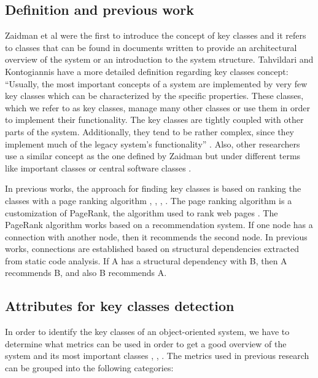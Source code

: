 \documentclass[12pt]{mitthesis}
\begin{document}
\subsection{Definition and previous work}
\label{sec:definition}
Zaidman et al \cite{ZaidmanJurnal} were the first to introduce the concept of key classes and it refers to classes that can be found in documents written to provide an architectural overview of the system or an introduction to the system structure. 
Tahvildari and Kontogiannis have a more detailed definition regarding key classes concept: “Usually, the most important concepts of a system are implemented by very few key classes which can be characterized by the specific properties. These classes, which we refer to as key classes, manage many other classes or use them in order to implement their functionality. The key classes are tightly coupled with other parts of the system. Additionally, they tend to be rather complex, since they implement much of the legacy system’s functionality” \cite{Tahvildari2004ImprovingDQ}.
Also, other researchers use a similar concept as the one defined by Zaidman but under different terms like important classes  \cite{Meyer2014IdentifyingIC} or central software classes \cite{CentralClassesSteidl}.


In previous works, the approach for finding key classes is based on ranking the classes with a page ranking algorithm \cite{PagerankENASE}, \cite{enase15}, \cite{Finding-key-classes}, \cite{PagerankSACI} . The page ranking algorithm is a customization of PageRank, the algorithm used to rank web pages \cite{ilprints422}. 
The PageRank algorithm works based on a recommendation system. If one node has a connection with another node, then it recommends the second node. In previous works, connections are established based on structural dependencies extracted from static code analysis. If A has a structural dependency with B, then A recommends B, and also B recommends A. 

\subsection{Attributes for key classes detection}
In order to identify the key classes of an object-oriented system, we have to determine what metrics can be used in order to get a good overview of the system and its most important classes \cite{Ding2016AnIA}, \cite{ZaidmanJurnal}, \cite{PAN2018188} . 
The metrics used in previous research can be grouped into the following categories: 
\end{document}
